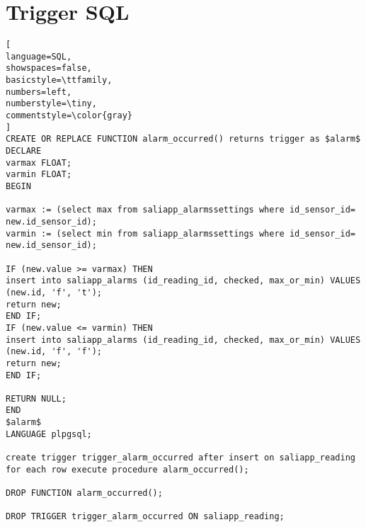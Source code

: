 \chapter{Trigger SQL }


\begin{lstlisting}[
language=SQL,
showspaces=false,
basicstyle=\ttfamily,
numbers=left,
numberstyle=\tiny,
commentstyle=\color{gray}
]
CREATE OR REPLACE FUNCTION alarm_occurred() returns trigger as $alarm$ 
DECLARE
varmax FLOAT;
varmin FLOAT;
BEGIN

varmax := (select max from saliapp_alarmssettings where id_sensor_id= new.id_sensor_id);
varmin := (select min from saliapp_alarmssettings where id_sensor_id= new.id_sensor_id);

IF (new.value >= varmax) THEN 
insert into saliapp_alarms (id_reading_id, checked, max_or_min) VALUES (new.id, 'f', 't');
return new;
END IF;
IF (new.value <= varmin) THEN 
insert into saliapp_alarms (id_reading_id, checked, max_or_min) VALUES (new.id, 'f', 'f');
return new;
END IF;

RETURN NULL;
END
$alarm$
LANGUAGE plpgsql;

create trigger trigger_alarm_occurred after insert on saliapp_reading
for each row execute procedure alarm_occurred(); 

DROP FUNCTION alarm_occurred(); 

DROP TRIGGER trigger_alarm_occurred ON saliapp_reading;


\end{lstlisting}
